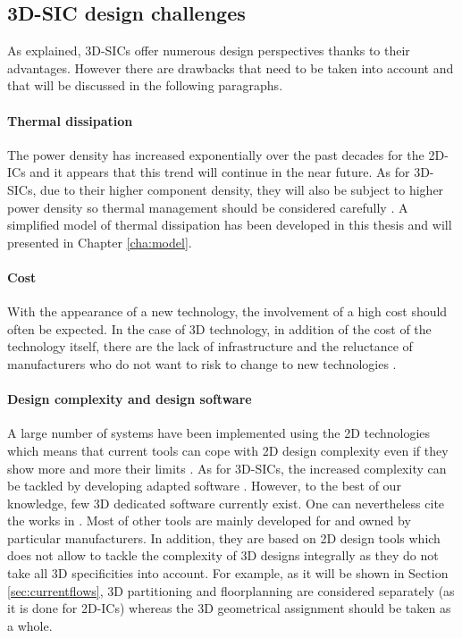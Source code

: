 \subsection{3D-SIC design challenges}

As explained, 3D-SICs offer numerous design perspectives thanks to their advantages. However there are drawbacks that need to be taken into account and that will be discussed in the following paragraphs.

\paragraph{Thermal dissipation}
The power density has increased exponentially over the past decades for the 2D-ICs and it appears that this trend will continue in the near future. As for 3D-SICs, due to their higher component density, they will also be subject to higher power density so thermal management should be considered carefully \cite{659500}. A simplified model of thermal dissipation has been developed in this thesis and will presented in Chapter \ref{cha:model}.

\paragraph{Cost}
With the appearance of a new technology, the involvement of a high cost should often be expected. In the case of 3D technology, in addition of the cost of the technology itself, there are the lack of infrastructure and the reluctance of manufacturers who do not want to risk to change to new technologies \cite{659500}.

\paragraph{Design complexity and design software}
A large number of systems have been implemented using the 2D technologies which means that current tools can cope with 2D design complexity even if they show more and more their limits \cite{vanderbiest06, PFF10}. As for 3D-SICs, the increased complexity can be tackled by developing adapted software \cite{659500}. However, to the best of our knowledge, few 3D dedicated software currently exist. One can nevertheless cite the works in \cite{1112292,1594713,Xie:2006:DSE:1148015.1148016,4735042}. Most of other tools are mainly developed for and owned by particular manufacturers. In addition, they are based on 2D design tools which does not allow to tackle the complexity of 3D designs integrally as they do not take all 3D specificities into account. For example, as it will be shown in Section \ref{sec:currentflows}, 3D partitioning and floorplanning are considered separately (as it is done for 2D-ICs) whereas the 3D geometrical assignment should be taken as a whole.

